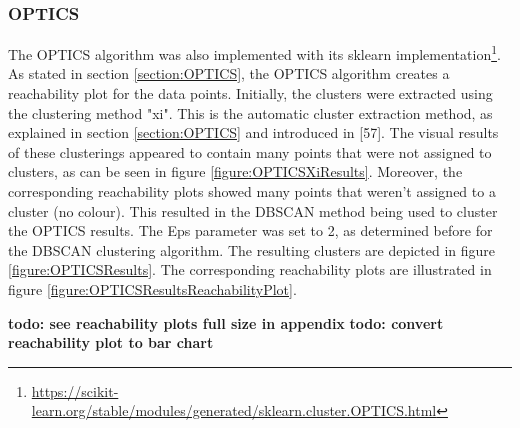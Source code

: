 \subsubsection{OPTICS}
The OPTICS algorithm was also implemented with its sklearn implementation\footnote{\url{https://scikit-learn.org/stable/modules/generated/sklearn.cluster.OPTICS.html}}. As stated in section \ref{section:OPTICS}, the OPTICS algorithm creates a reachability plot for the data points. Initially, the clusters were extracted using the clustering method "xi". This is the automatic cluster extraction method, as explained in section \ref{section:OPTICS} and introduced in \textcite{OPTICS}[57]. The visual results of these clusterings appeared to contain many points that were not assigned to clusters, as can be seen in figure \ref{figure:OPTICSXiResults}. Moreover, the corresponding reachability plots showed many points that weren't assigned to a cluster (no colour). This resulted in the DBSCAN method being used to cluster the OPTICS results. The Eps parameter was set to 2, as determined before for the DBSCAN clustering algorithm. The resulting clusters are depicted in figure \ref{figure:OPTICSResults}. The corresponding reachability plots are illustrated in figure \ref{figure:OPTICSResultsReachabilityPlot}.

\textbf{todo: see reachability plots full size in appendix}
\textbf{todo: convert reachability plot to bar chart}


